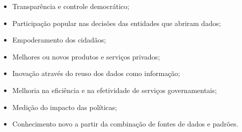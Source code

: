 \begin{itemize}
\item Transparência e controle democrático;
\item Participação popular nas decisões das entidades que abriram dados;
\item Empoderamento dos cidadãos;
\item Melhores ou novos produtos e serviços privados;
\item Inovação através do reuso dos dados como informação;
\item Melhoria na eficiência e na efetividade de serviços governamentais;
\item Medição do impacto das políticas;
\item Conhecimento novo a partir da combinação de fontes de dados e padrões.

\end{itemize}















